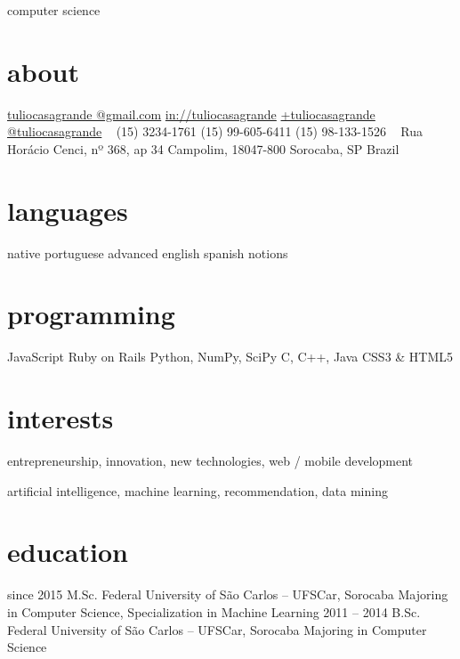 \documentclass[]{friggeri-cv}
\begin{document}
       {computer science}


\begin{aside}
  \section{about}
    \href{mailto:tuliocasagrande@gmail.com}{tuliocasagrande @gmail.com}
    \href{http://www.linkedin.com/in/tuliocasagrande}{in://tuliocasagrande}
    \href{https://plus.google.com/+tuliocasagrande}{+tuliocasagrande}
    \href{https://twitter.com/tuliocasagrande}{@tuliocasagrande}
    ~
    (15) 3234-1761
    (15) 99-605-6411
    (15) 98-133-1526
    ~
    Rua Horácio Cenci,
    nº 368, ap 34
    Campolim, 18047-800
    Sorocaba, SP
    Brazil
  \section{languages}
    native portuguese
    advanced english
    spanish notions
  \section{programming}
    JavaScript
    Ruby on Rails
    Python, NumPy, SciPy
    C, C++, Java
    CSS3 \& HTML5
\end{aside}

\section{interests}

entrepreneurship, innovation, new technologies, web / mobile development

artificial intelligence, machine learning, recommendation, data mining

\section{education}

\begin{entrylist}
  \entry
   {since 2015}
   {M.Sc.}
   {Federal University of São Carlos -- UFSCar, Sorocaba}
   {Majoring in Computer Science, Specialization in Machine Learning}
  \entry
    {2011 – 2014}
    {B.Sc.}
    {Federal University of São Carlos -- UFSCar, Sorocaba}
    {Majoring in Computer Science}
\end{entrylist}
\end{document}
